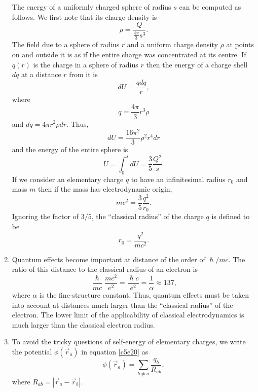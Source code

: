 \begin{enumerate}
The energy of a uniformly charged sphere of radius $s$ can be computed as 
follows.  We first note that its charge density is
\begin{equation}\label{c5e21}
\rho = \frac{Q}{\frac{4\pi}{3}s^3}.
\end{equation}
The field due to a sphere of radius $r$ and a uniform charge density $\rho$ at 
points on and outside it is as if the entire charge was concentrated at its 
centre. If $q(r)$ is the charge in a sphere of radius $r$ then the energy
of a charge shell $dq$ at a distance $r$ from it is
\[
dU = \frac{qdq}{r},
\]
where 
\[
q = \frac{4\pi}{3}r^3 \rho
\]
and $dq = 4\pi r^2 \rho dr$. Thus,
\[
dU = \frac{16\pi^2}{3}\rho^2 r^4dr
\]
and the energy of the entire sphere is
\begin{equation}\label{c5e22}
U = \int_0^s dU = \frac{3}{5}\frac{Q^2}{s}.
\end{equation}
If we consider an elementary charge $q$ to have an infinitesimal radius $r_0$ 
and mass $m$ then if the mass has electrodynamic origin,
\[
mc^2 = \frac{3}{5}\frac{q^2}{r_0}.
\]
Ignoring the factor of $3/5$, the ``classical radius'' of the charge $q$ is 
defined to be
\begin{equation}\label{c5e23}
r_0 = \frac{q^2}{mc^2}.
\end{equation}

\item Quantum effects become important at distance of the order of $\hslash/mc$.
The ratio of this distance to the classical radius of an electron is
\[
\frac{\hslash}{mc}\frac{mc^2}{e^2} = \frac{\hslash c}{e^2} = \frac{1}{\alpha}
\approx 137,
\]
where $\alpha$ is the fine-structure constant. Thus, quantum effects must be 
taken into account at distances much larger than the ``classical radius'' of 
the electron.  The lower limit of the applicability of classical electrodynamics
is much larger than the classical electron radius.

\item To avoid the tricky questions of self-energy of elementary charges, we 
write the potential $\phi(\vec{r}_a)$ in equation \eqref{c5e20} as
\begin{equation}\label{c5e24}
\phi(\vec{r}_a) = \sum_{b \ne a} \frac{q_b}{R_{ab}},
\end{equation}
where $R_{ab} = |\vec{r}_a - \vec{r}_b|$.


\end{enumerate}
